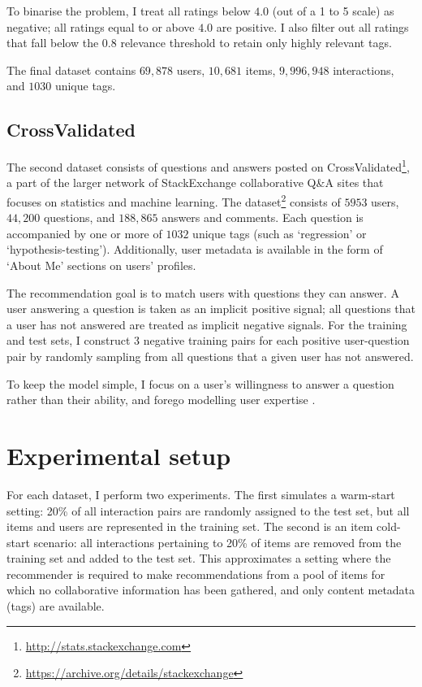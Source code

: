 \documentclass{sig-alternate}
\begin{document}
To binarise the problem, I treat all ratings below $4.0$ (out of a 1 to 5 scale) as negative; all ratings equal to or above $4.0$ are positive. I also filter out all ratings that fall below the $0.8$ relevance threshold to retain only highly relevant tags.

The final dataset contains $69,878$ users, $10,681$ items, $9,996,948$ interactions, and $1030$ unique tags.

\subsection{CrossValidated}
The second dataset consists of questions and answers posted on CrossValidated\footnote{\url{http://stats.stackexchange.com}}, a part of the larger network of StackExchange collaborative Q\&A sites that focuses on statistics and machine learning. The dataset\footnote{\url{https://archive.org/details/stackexchange}} consists of $5953$ users, $44,200$ questions, and $188,865$ answers and comments. Each question is accompanied by one or more of $1032$ unique tags (such as `regression' or `hypothesis-testing'). Additionally, user metadata is available in the form of `About Me' sections on users' profiles.

The recommendation goal is to match users with questions they can answer. A user answering a question is taken as an implicit positive signal; all questions that a user has not answered are treated as implicit negative signals. For the training and test sets, I construct 3 negative training pairs for each positive user-question pair by randomly sampling from all questions that a given user has not answered.

To keep the model simple, I focus on a user's willingness to answer a question rather than their ability, and forego modelling user expertise \cite{san2014question}.

\section{Experimental setup}
\label{sec:setup}

For each dataset, I perform two experiments. The first simulates a warm-start setting: 20\% of all interaction pairs are randomly assigned to the test set, but all items and users are represented in the training set. The second is an item cold-start scenario: all interactions pertaining to 20\% of items are removed from the training set and added to the test set. This approximates a setting where the recommender is required to make recommendations from a pool of items for which no collaborative information has been gathered, and only content metadata (tags) are available.
\end{document}
